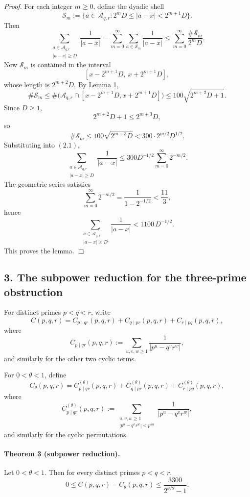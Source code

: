 \emph{Proof.}
For each integer \(m\ge 0\), define the dyadic shell
\[
\mathcal S_m:=\{a\in \mathcal A_{q,r}: 2^m D\le |a-x|<2^{m+1}D\}.
\]
Then
\[
\sum_{\substack{a\in\mathcal A_{q,r}\\ |a-x|\ge D}}\frac{1}{|a-x|}
=
\sum_{m=0}^{\infty}\sum_{a\in \mathcal S_m}\frac{1}{|a-x|}
\le
\sum_{m=0}^{\infty}\frac{\#\mathcal S_m}{2^m D}.
\tag{2.1}
\]
Now \(\mathcal S_m\) is contained in the interval
\[
[x-2^{m+1}D,\ x+2^{m+1}D],
\]
whose length is \(2^{m+2}D\). By Lemma 1,
\[
\#\mathcal S_m\le \#\bigl(\mathcal A_{q,r}\cap [x-2^{m+1}D,x+2^{m+1}D]\bigr)
\le 100\sqrt{2^{m+2}D+1}.
\]
Since \(D\ge 1\),
\[
2^{m+2}D+1\le 2^{m+3}D,
\]
so
\[
\#\mathcal S_m\le 100\sqrt{2^{m+3}D}<300\cdot 2^{m/2}D^{1/2}.
\]
Substituting into \((2.1)\),
\[
\sum_{\substack{a\in\mathcal A_{q,r}\\ |a-x|\ge D}}\frac{1}{|a-x|}
\le
300D^{-1/2}\sum_{m=0}^{\infty}2^{-m/2}.
\]
The geometric series satisfies
\[
\sum_{m=0}^{\infty}2^{-m/2}=\frac{1}{1-2^{-1/2}}<\frac{11}{3},
\]
hence
\[
\sum_{\substack{a\in\mathcal A_{q,r}\\ |a-x|\ge D}}\frac{1}{|a-x|}
<1100\,D^{-1/2}.
\]
This proves the lemma.
\hfill\(\Box\)

\subsection*{3. The subpower reduction for the three-prime obstruction}

For distinct primes \(p<q<r\), write
\[
C(p,q,r)=C_{p\mid qr}(p,q,r)+C_{q\mid pr}(p,q,r)+C_{r\mid pq}(p,q,r),
\]
where
\[
C_{p\mid qr}(p,q,r):=\sum_{u,v,w\ge 1}\frac{1}{|p^u-q^v r^w|},
\]
and similarly for the other two cyclic terms.

For \(0<\theta<1\), define
\[
C_\theta(p,q,r)=C_{p\mid qr}^{(\theta)}(p,q,r)
+
C_{q\mid pr}^{(\theta)}(p,q,r)
+
C_{r\mid pq}^{(\theta)}(p,q,r),
\]
where
\[
C_{p\mid qr}^{(\theta)}(p,q,r)
:=
\sum_{\substack{u,v,w\ge 1\\ |p^u-q^v r^w|<p^{\theta u}}}
\frac{1}{|p^u-q^v r^w|},
\]
and similarly for the cyclic permutations.

\paragraph{Theorem 3 (subpower reduction).}
Let \(0<\theta<1\). Then for every distinct primes \(p<q<r\),
\[
0\le C(p,q,r)-C_\theta(p,q,r)\le \frac{3300}{2^{\theta/2}-1}.
\]

